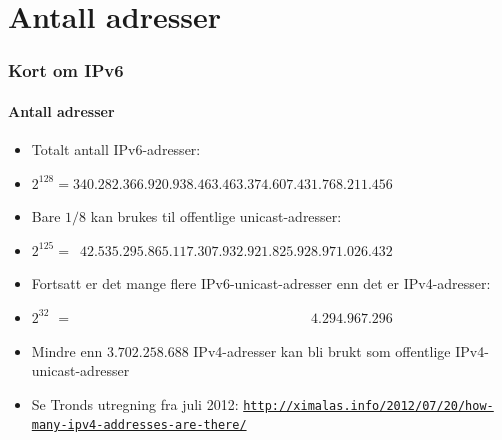 \section{Antall adresser}
\begin{frame}%
  \frametitle{Kort om IPv6}
  \framesubtitle{Antall adresser}
  \pause
  \begin{itemize}[<+->]
  \item Totalt antall IPv6-adresser:
  \item \(2^{128}=340.282.366.920.938.463.463.374.607.431.768.211.456\)
  \item Bare \(1/8\) kan brukes til offentlige unicast-adresser:
  \item
    \(2^{125}=\phantom{0}42.535.295.865.117.307.932.921.825.928.971.026.432\)
  \item Fortsatt er det mange flere IPv6-unicast-adresser enn det er
    IPv4-adresser:
  \item
    \(2^{32\phantom{0}}=\phantom{000.000.000.000.000.000.000.000.000.00}4.294.967.296\)
  \item Mindre enn \alert<9>{\(3.702.258.688\)} IPv4-adresser kan bli
    brukt som offentlige IPv4-unicast-adresser
  \item Se Tronds utregning fra juli 2012:
    \texttt{\url{http://ximalas.info/2012/07/20/how-many-ipv4-addresses-are-there/}}
  \end{itemize}
\end{frame}

